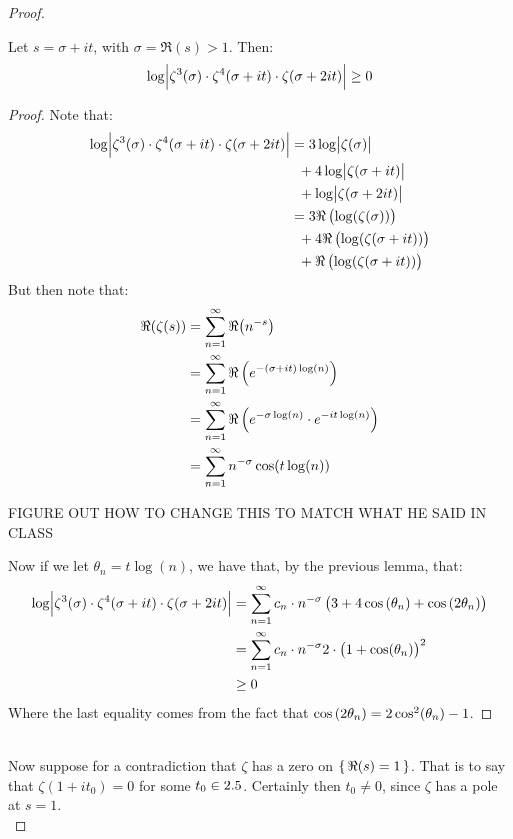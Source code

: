 \begin{proof}
\begin{lemma}
Let $s = \sigma + i t$, with $\sigma = \Re(s) > 1$. Then:
\begin{align*}
    \log \abs{ \zeta^3 (\sigma) \cdot \zeta^4 (\sigma+it) \cdot \zeta(\sigma + 2 it) } \geq 0
\end{align*}
\end{lemma}

\begin{proof}
Note that:
\begin{align*}
    \log \abs{ \zeta^3 (\sigma) \cdot \zeta^4 (\sigma+it) \cdot \zeta(\sigma + 2 it) } &= 3 \log \abs{ \zeta (\sigma) } \\&\;\; + 4 \log \abs{ \zeta (\sigma+it) } \\&\;\; + \log \abs { \zeta(\sigma + 2 it) } \\&= 3 \Re \left(  \log(\zeta(\sigma)) \right) \\&\;\;+ 4 \Re \left(  \log(\zeta(\sigma+i t)) \right) \\&\;\;+ \Re \left(  \log(\zeta(\sigma+ it)) \right)
\end{align*}
But then note that:
\begin{align*}
    \Re (\zeta(s)) &= \sum_{n=1}^\infty \Re \big(n^{-s}\big) \\&= \sum_{n=1}^\infty \Re \left(  e^{-(\sigma + it) \log(n)} \right) \\&= \sum_{n=1}^\infty \Re \left(  e^{- \sigma \log(n)} \cdot e^{-i t \log(n)}   \right) \\&= \sum_{n=1}^\infty n^{- \sigma} \cos (t \log(n))
\end{align*}

FIGURE OUT HOW TO CHANGE THIS TO MATCH WHAT HE SAID IN CLASS

Now if we let $\theta_n = t \log(n)$, we have that, by the previous lemma, that:
\begin{align*}
    \log \abs{ \zeta^3 (\sigma) \cdot \zeta^4 (\sigma+it) \cdot \zeta(\sigma + 2 it) } &= \sum_{n=1}^\infty c_n \cdot n^{-\sigma} \left(  3 + 4  \cos\left( \theta_n \right) + \cos\left(  2 \theta_n \right) \right)\\
     &= \sum_{n=1}^\infty c_n \cdot n^{-\sigma} 2 \cdot \left(  1 + \cos(\theta_n)  \right)^2 \\ &\geq 0
\end{align*}
Where the last equality comes from the fact that $\cos\left(  2 \theta_n \right) = 2 \cos^2 ( \theta_n) - 1$.
\end{proof}\\

Now suppose for a contradiction that $\zeta$ has a zero on $\set{\Re(s) = 1}$. That is to say that $\zeta ( 1 + i t_0 ) = 0$ for some $t_0 \in 2.5$. Certainly then $t_0 \neq 0$, since $\zeta$ has a pole at $s=1$.\\


\end{proof}
